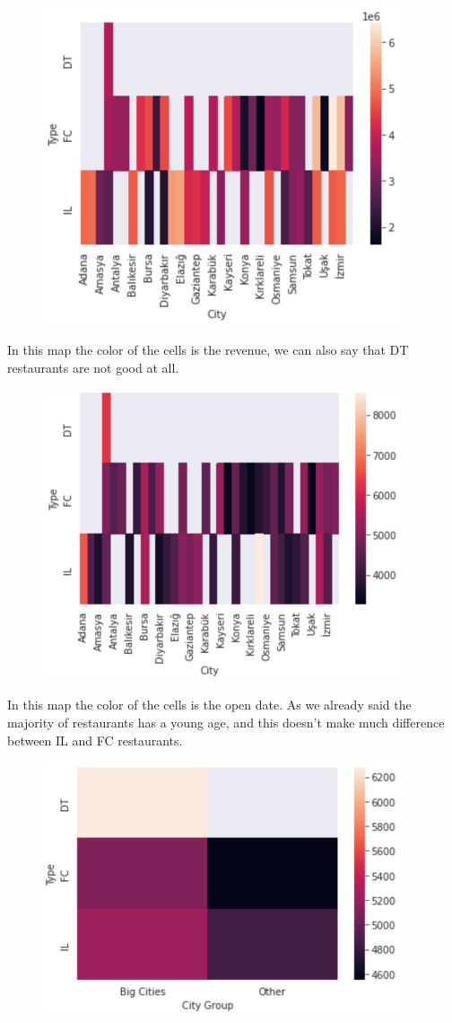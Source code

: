 \documentclass[a4paper,10pt]{report}
\begin{document}
\begin{figure}[H]
    \centering
    \includegraphics[width = 300pt]{img/revenuepivot.png}
  \end{figure} 
In this map the color of the cells is the revenue, we can also say that DT restaurants are not good at all.
\begin{figure}[H]
    \centering
    \includegraphics[width = 300pt]{img/opendatepivot.png}
  \end{figure} 
In this map the color of the cells is the open date. As we already said the majority of restaurants has a young age, and this doesn't make much difference between IL and FC restaurants.
\begin{figure}[H]
    \centering
    \includegraphics[width = 300pt]{img/citygrouppivot.png}
  \end{figure} 
\end{document}
